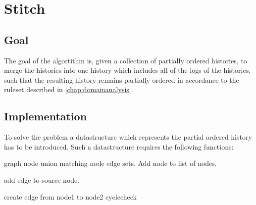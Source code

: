 
\section{Stitch}
\subsection{Goal} %
The goal of the algortithm is, given a collection of partially ordered histories, to merge the histories into one history which includes all of the logs of the histories, such that the resulting history remains partially ordered in accordance to the ruleset described in \autoref{chap:domainanalysis}.


\subsection{Implementation} %
To solve the problem a datastructure which represents the partial ordered history has to be introduced. Such a datastructure requires the following functions:

\begin{algorithmic}
 {graph node}
	    \State union matching node edge sets.
	\Else
	    \State Add node to list of nodes.
	\EndIf
\EndFunction

\State\State

	\State add edge to source node.
\EndFunction

\State\State

		\State{}
	\EndFor
\EndFor
{}
				\State create edge from node1 to node2
			\EndIf
		\EndIf
	\EndFor
\EndFor
\State cyclecheck
\EndFunction
\end{algorithmic}

